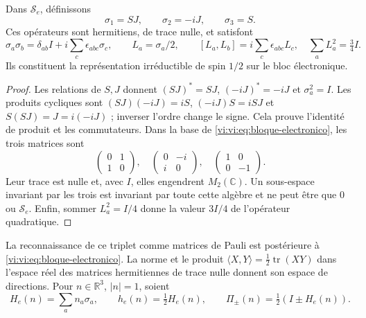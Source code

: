 \begin{proposition}
\label{vi:vi:prop:spin}
Dans $\mathscr S_e$, définissons
\begin{equation}
 \sigma_1=SJ,\qquad \sigma_2=-iJ,\qquad \sigma_3=S.
 \label{vi:vi:eq:terna}
\end{equation}
Ces opérateurs sont hermitiens, de trace nulle, et satisfont
\begin{equation}
 \sigma_a\sigma_b=\delta_{ab}I+
 i\sum_c\epsilon_{abc}\sigma_c,
 \qquad L_a=\sigma_a/2,\qquad
 [L_a,L_b]=i\sum_c\epsilon_{abc}L_c,
 \quad\sum_aL_a^2=\tfrac34I.
 \label{vi:vi:eq:spin-algebra}
\end{equation}
Ils constituent la représentation irréductible de spin $1/2$ sur
le bloc électronique.
\end{proposition}
\begin{proof}
Les relations de $S,J$ donnent $(SJ)^*=SJ$, $(-iJ)^*=-iJ$ et
$\sigma_a^2=I$. Les produits cycliques sont
$(SJ)(-iJ)=iS$, $(-iJ)S=iSJ$ et $S(SJ)=J=i(-iJ)$ ;
inverser l’ordre change le signe. Cela prouve l’identité de
produit et les commutateurs. Dans la base de
\eqref{vi:vi:eq:bloque-electronico}, les trois matrices sont
\[
 \begin{pmatrix}0&1\\1&0\end{pmatrix},\quad
 \begin{pmatrix}0&-i\\i&0\end{pmatrix},\quad
 \begin{pmatrix}1&0\\0&-1\end{pmatrix}.
\]
Leur trace est nulle et, avec $I$, elles engendrent $M_2(\mathbb C)$.
Un sous-espace invariant par les trois est invariant par toute cette
algèbre et ne peut être que $0$ ou $\mathscr S_e$. Enfin,
sommer $L_a^2=I/4$ donne la valeur $3I/4$ de l’opérateur quadratique.
\end{proof}

La reconnaissance de ce triplet comme matrices de Pauli est postérieure
à \eqref{vi:vi:eq:bloque-electronico}. La norme et le produit
$\langle X,Y\rangle=\tfrac12\operatorname{tr}(XY)$ dans
l’espace réel des matrices hermitiennes de trace nulle donnent son espace
de directions. Pour $n\in\mathbb R^3$, $|n|=1$, soient
\begin{equation}
 H_e(n)=\sum_an_a\sigma_a,\qquad
 h_e(n)=\tfrac12H_e(n),\qquad
 \Pi_\pm(n)=\tfrac12(I\pm H_e(n)).
 \label{vi:vi:eq:helicidad}
\end{equation}

